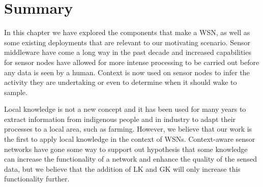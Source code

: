 



\section{Summary}
	In this chapter we have explored the components that make a WSN, as well as some existing deployments that are relevant to our motivating scenario. Sensor middleware have come a long way in the past decade and increased capabilities for sensor nodes have allowed for more intense processing to be carried out before any data is seen by a human. Context is now used on sensor nodes to infer the activity they are undertaking or even to determine when it should wake to sample. 

Local knowledge is not a new concept and it has been used for many years to extract information from indigenous people and in industry to adapt their processes to a local area, such as farming. However, we believe that our work is the first to apply local knowledge in the context of WSNs. Context-aware sensor networks have gone some way to support out hypothesis that some knowledge can increase the functionality of a network and enhance the quality of the sensed data, but we believe that the addition of LK and GK will only increase this functionality further.

